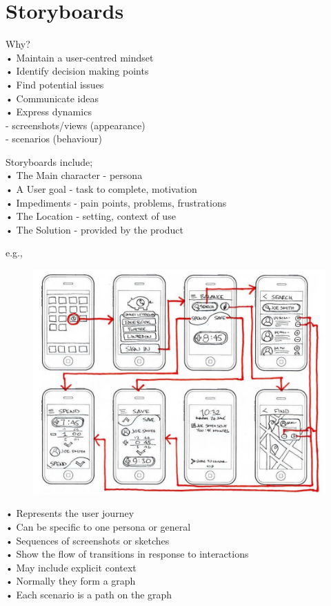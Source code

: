 \documentclass[]{project_plan}
\begin{document}
\section{Storyboards}

Why?\\
• Maintain a user-centred mindset\\
• Identify decision making points\\
• Find potential issues\\
• Communicate ideas\\
• Express dynamics\\
- screenshots/views (appearance)\\
- scenarios (behaviour)

Storyboards include;\\
• The Main character - persona\\
• A User goal - task to complete, motivation\\
• Impediments - pain points, problems, frustrations\\
• The Location - setting, context of use\\
• The Solution - provided by the product

\newpage
e.g.,
\begin{figure}[h!]
  \centering
  \includegraphics[width=\linewidth]{storyboard_example.png}
\end{figure}
• Represents the user journey\\
• Can be specific to one persona or general\\
• Sequences of screenshots or sketches\\
• Show the flow of transitions in response to interactions\\
• May include explicit context\\
• Normally they form a graph\\
• Each scenario is a path on the graph
\end{document}
